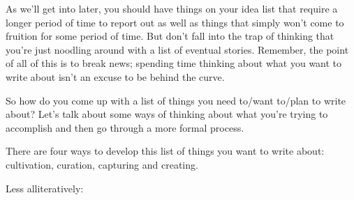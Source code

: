 \documentclass[
  12pt,
  american,
  letterpaperpaper,
  extrafontsizes,onecolumn,openright
  ]{memoir}
\begin{document}
As we'll get into later, you should have things on your idea list that require a longer period of time to report out as well as things that simply won't come to fruition for some period of time. But don't fall into the trap of thinking that you're just noodling around with a list of eventual stories. Remember, the point of all of this is to break news; spending time thinking about what you want to write about isn't an excuse to be behind the curve.

So how do you come up with a list of things you need to/want to/plan to write about? Let's talk about some ways of thinking about what you're trying to accomplish and then go through a more formal process.

There are four ways to develop this list of things you want to write about: cultivation, curation, capturing and creating.

Less alliteratively:
\end{document}
